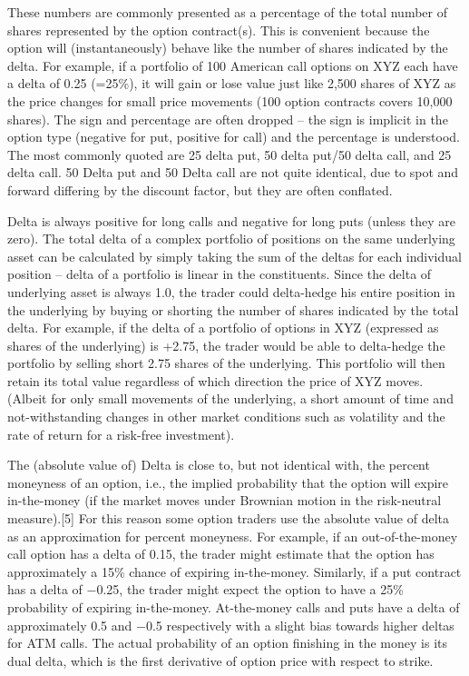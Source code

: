 \documentclass[10pt,landscape]{article}
\begin{document}
\begin{multicols}{3}
\vspace{0.15cm}

These numbers are commonly presented as a percentage of the total number of shares represented by the option contract(s). This is convenient because the option will (instantaneously) behave like the number of shares indicated by the delta. For example, if a portfolio of 100 American call options on XYZ each have a delta of 0.25 (=25\%), it will gain or lose value just like 2,500 shares of XYZ as the price changes for small price movements (100 option contracts covers 10,000 shares). The sign and percentage are often dropped – the sign is implicit in the option type (negative for put, positive for call) and the percentage is understood. The most commonly quoted are 25 delta put, 50 delta put/50 delta call, and 25 delta call. 50 Delta put and 50 Delta call are not quite identical, due to spot and forward differing by the discount factor, but they are often conflated. 

\vspace{0.15cm}

Delta is always positive for long calls and negative for long puts (unless they are zero). The total delta of a complex portfolio of positions on the same underlying asset can be calculated by simply taking the sum of the deltas for each individual position – delta of a portfolio is linear in the constituents. Since the delta of underlying asset is always 1.0, the trader could delta-hedge his entire position in the underlying by buying or shorting the number of shares indicated by the total delta. For example, if the delta of a portfolio of options in XYZ (expressed as shares of the underlying) is +2.75, the trader would be able to delta-hedge the portfolio by selling short 2.75 shares of the underlying. This portfolio will then retain its total value regardless of which direction the price of XYZ moves. (Albeit for only small movements of the underlying, a short amount of time and not-withstanding changes in other market conditions such as volatility and the rate of return for a risk-free investment). 

\vspace{0.15cm}

The (absolute value of) Delta is close to, but not identical with, the percent moneyness of an option, i.e., the implied probability that the option will expire in-the-money (if the market moves under Brownian motion in the risk-neutral measure).[5] For this reason some option traders use the absolute value of delta as an approximation for percent moneyness. For example, if an out-of-the-money call option has a delta of 0.15, the trader might estimate that the option has approximately a 15\% chance of expiring in-the-money. Similarly, if a put contract has a delta of −0.25, the trader might expect the option to have a 25\% probability of expiring in-the-money. At-the-money calls and puts have a delta of approximately 0.5 and −0.5 respectively with a slight bias towards higher deltas for ATM calls. The actual probability of an option finishing in the money is its dual delta, which is the first derivative of option price with respect to strike.


\end{multicols}
\end{document}
